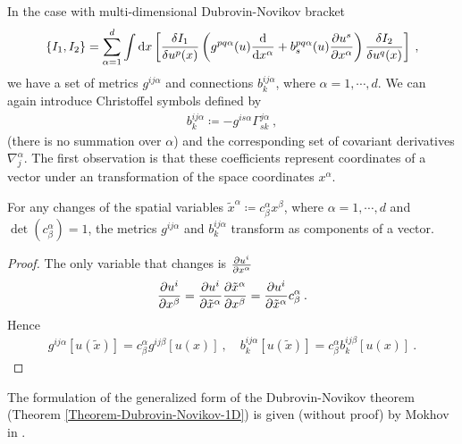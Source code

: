 In the case with multi-dimensional Dubrovin-Novikov bracket
\begin{align}
    \left \lbrace I_1,I_2 \right \rbrace = \sum_{\alpha = 1}^ d \int \mathrm{d} x 
    \left[ \frac{\delta I_1}{\delta u^p(x)} \left( g^{pq \alpha}(u) \frac{\mathrm{d}}{\mathrm{d}x^\alpha} + b^{pq\alpha}_s(u) \frac{\partial u^s}{\partial x^\alpha} \right) \frac{\delta I_2}{\delta u^q(x)} \right] \:, \label{eq:multi-dimensional bracket}
\end{align}
we have a set of metrics $g^{ij \alpha}$ and connections $b^{ij \alpha}_k$, where $\alpha = 1 , \cdots, d$. We can again introduce Christoffel symbols defined by
\begin{align}
    b^{i j \alpha}_k \coloneqq - g^{is \alpha} \Gamma^{j \alpha}_{sk}\:,
\end{align}
(there is no summation over $\alpha$) and the corresponding set of covariant derivatives $\nabla^{\alpha}_j$. The first observation is that these coefficients represent coordinates of a vector under an transformation of the space coordinates $x^\alpha$.
\begin{proposition}
    For any changes of the spatial variables $\tilde x^\alpha \coloneqq c^\alpha_\beta x^\beta$, where $\alpha = 1, \cdots, d$ and $\det (c^\alpha_\beta) = 1$, the metrics $g^{ij \alpha}$ and $b^{ij \alpha}_k$ transform as components of a vector.
\end{proposition}

\begin{proof}
    The only variable that changes is $\frac{\partial u^i}{\partial x^\alpha}$
    \begin{align}
        \frac{\partial u^i}{\partial x^\beta} = \frac{\partial u^i}{\partial \tilde x^\alpha} \frac{\partial \tilde x^\alpha}{\partial x^\beta} = \frac{\partial u^i}{\partial \tilde x^\alpha} c^\alpha_\beta \:.
    \end{align}
    Hence
    \begin{align}
        g^{ij \alpha}[u(\tilde x)] = c^\alpha_\beta g^{ij \beta}[u(x)] \:, \quad b^{ij \alpha}_k [u(\tilde x)] = c^\alpha_\beta b^{ij \beta}_k [u(x)] \:.
    \end{align}
\end{proof}


The formulation of the generalized form of the Dubrovin-Novikov theorem (Theorem \vref{Theorem-Dubrovin-Novikov-1D}) is given (without proof) by Mokhov in \cite{Mochov}.

